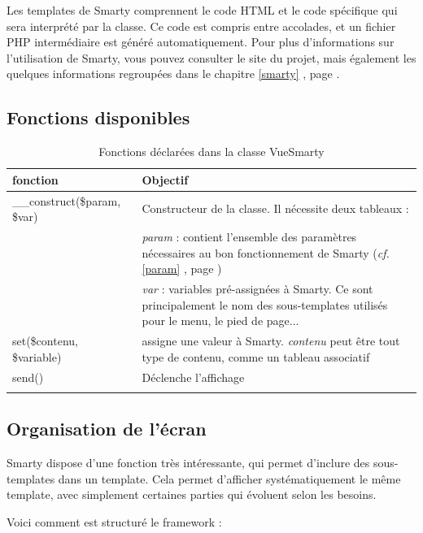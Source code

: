 Les templates de Smarty comprennent le code HTML et le code spécifique qui sera interprété par la classe. Ce code est compris entre accolades, et un fichier PHP intermédiaire est généré automatiquement. Pour plus d'informations sur l'utilisation de Smarty, vous pouvez consulter le site du projet, mais également les quelques informations regroupées dans le chapitre \ref{smarty} \textit{}, page \pageref{smarty}.

\subsection{Fonctions disponibles}
\begin{longtable}{|p{5cm}|p{8cm}|}
\hline
\textbf{fonction} & \textbf{Objectif} \\
\hline
\endhead
\_\_construct(\$param, \$var) & Constructeur de la classe. Il nécessite deux tableaux : \\
 & \textit{param} : contient l'ensemble des paramètres nécessaires au bon fonctionnement de Smarty (\textit{cf.} \ref{param} \textit{\nameref{param}}, page \pageref{param})\\
 & \textit{var} : variables pré-assignées à Smarty. Ce sont principalement le nom des sous-templates utilisés pour le menu, le pied de page...\\
 \hline
 set(\$contenu, \$variable) & assigne une valeur à Smarty. \textit{contenu} peut être tout type de contenu, comme un tableau associatif \\
 \hline
 send() & Déclenche l'affichage \\
\hline
\caption{Fonctions déclarées dans la classe VueSmarty}
\end{longtable}


\subsection{Organisation de l'écran}
Smarty dispose d'une fonction très intéressante, qui permet d'inclure des sous-templates dans un template. Cela permet d'afficher systématiquement le même template, avec simplement certaines parties qui évoluent selon les besoins.

Voici comment est structuré le framework :

